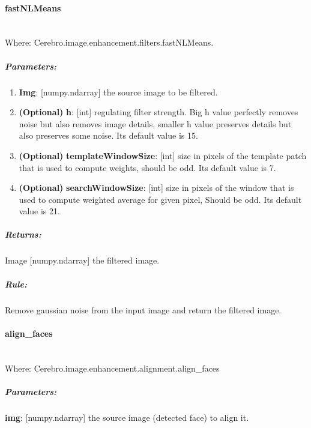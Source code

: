 \paragraph{fastNLMeans} \mbox{} \\
Where: Cerebro.image.enhancement.filters.fastNLMeans.
\subparagraph{Parameters:}
\begin{changemargin}{0.5cm}{0cm}
	\begin{enumerate} 
		\item \textbf{Img}: [numpy.ndarray] the source image to be filtered.
		\item \textbf{(Optional)} \textbf{h}: [int] regulating filter strength. Big h value perfectly removes noise but also removes image details, smaller h value preserves details but also preserves some noise. Its default value is 15.
		\item \textbf{(Optional)} \textbf{templateWindowSize}: [int] size in pixels of the template patch that is used to compute weights, should be odd. \newline Its default value is 7.
		\item \textbf{(Optional)} \textbf{searchWindowSize}: [int] size in pixels of the window that is used to compute weighted average for given pixel, Should be odd. \newline Its default value is 21.
	\end{enumerate}
\end{changemargin}

\subparagraph{Returns:}
\begin{changemargin}{1cm}{0cm}
	Image [numpy.ndarray] the filtered image.
\end{changemargin}

\subparagraph{Rule:}
\begin{changemargin}{1cm}{0cm}
	Remove gaussian noise from the input image and return the filtered image.
\end{changemargin}


\paragraph{align\_faces} \mbox{} \\
Where: Cerebro.image.enhancement.alignment.align\_faces
\subparagraph{Parameters:}
\begin{changemargin}{1cm}{0cm}
	\textbf{img}: [numpy.ndarray] the source image (detected face) to align it.
\end{changemargin}

